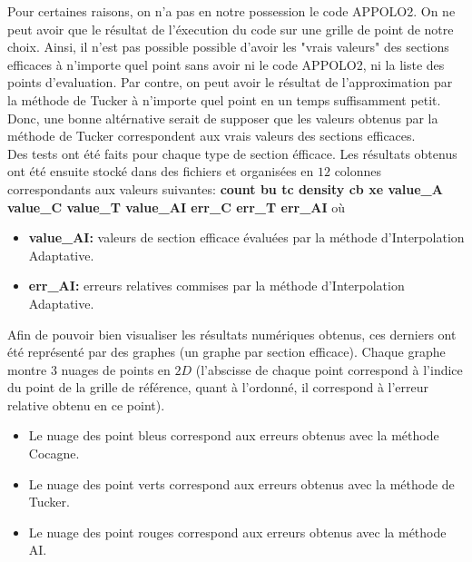 Pour certaines raisons, on n'a pas en notre possession le code APPOLO2. On ne peut avoir que le résultat de l'éxecution du code sur une grille de point de notre choix.
Ainsi, il n'est pas possible possible d'avoir les "vrais valeurs" des sections efficaces à n'importe quel point sans avoir ni le code APPOLO2, ni la liste des points d'evaluation.
Par contre, on peut avoir le résultat de l'approximation par la méthode de Tucker à n'importe quel point en un temps suffisamment petit.
Donc, une bonne altérnative serait de supposer que les valeurs obtenus par la méthode de Tucker correspondent aux vrais valeurs des sections efficaces.\\

Des tests ont été faits pour chaque type de section éfficace. Les résultats obtenus ont été ensuite stocké dans des fichiers et organisées en $12$ colonnes correspondants aux
valeurs suivantes: \textbf{count bu tc density cb xe value\_A value\_C value\_T value\_AI err\_C err\_T err\_AI} où
\begin{itemize}
\item \textbf{value\_AI:} valeurs de section efficace évaluées par la méthode d'Interpolation Adaptative.
\item \textbf{err\_AI:} erreurs relatives commises par la méthode d'Interpolation Adaptative.
\end{itemize}

Afin de pouvoir bien visualiser les résultats numériques obtenus, ces derniers ont été représenté par des graphes (un graphe par section efficace).
Chaque graphe montre $3$ nuages de points en $2D$ (l'abscisse de chaque point correspond à l'indice du point de la grille de référence,
quant à l'ordonné, il correspond à l'erreur relative obtenu en ce point).
\begin{itemize}
\item Le nuage des point bleus correspond aux erreurs obtenus avec la méthode Cocagne.
\item Le nuage des point verts correspond aux erreurs obtenus avec la méthode de Tucker.
\item Le nuage des point rouges correspond aux erreurs obtenus avec la méthode AI.
\end{itemize}

